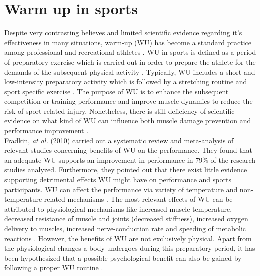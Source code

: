 \section{Warm up in sports}
Despite very contrasting believes and limited scientific evidence regarding it's effectiveness in many situations, warm-up (WU) has become a standard practice among professional and
recreational athletes \cite{bishop2003warm1, bishop2003warm2, shellock1985warming}. WU in sports is defined as a period of preparatory exercise which is carried out in order to prepare the athlete for the demands of the subsequent physical activity \cite{karvonen1992importance, woods2007warm, hedrick1992exercise}.
Typically, WU includes a short and low-intensity preparatory activity which is followed by a stretching routine and sport specific exercise \cite{safran1989warm}. 
The purpose of WU is to enhance the subsequent competition or training performance and improve muscle dynamics to reduce the risk of sport-related injury\cite{bishop2003warm1, shellock1985warming, knudson2008warm}. 
Nonetheless, there is still deficiency of scientific  evidence on what kind of WU can influence both muscle damage prevention and performance improvement \cite{safran1989warm}.\\ %
Fradkin, \textit{at al.} (2010) carried out a systematic review and meta-analysis of relevant studies concerning benefits of WU on the performance. They found that an adequate WU supports an improvement in performance in 79\% of the research studies analyzed. Furthermore, they pointed out that there exist little evidence supporting detrimental effects WU might have on performance and sports participants.
WU can affect the performance via variety of temperature and non-temperature related mechanisms \cite{bishop2003warm1}. 
The most relevant effects of WU can be attributed to physiological mechanisms like increased muscle temperature, decreased resistance of muscle and joints (decreased stiffness), increased oxygen delivery to muscles, increased nerve-conduction rate and speeding of metabolic reactions \cite{bishop2003warm1}. 
However, the benefits of WU are not exclusively physical. Apart from the physiological changes a body undergoes during this preparatory period, it has been hypothesized that a possible psychological benefit can also be gained by following a proper WU routine \cite{bishop2003warm1,shellock1985warming}.

